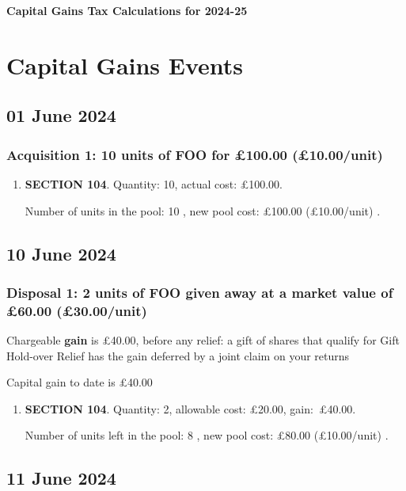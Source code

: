 \documentclass{article}
\begin{document}
\centerline{\Large\bfseries Capital Gains Tax Calculations for 2024-25}

\section*{Capital Gains Events}


\subsection*{01 June 2024}
\subsubsection*{
    Acquisition 1: 10 units of FOO for £100.00
    (£10.00/unit)%
}

\begin{enumerate}
\item \textbf{SECTION 104}. Quantity: 10,
    actual cost: £100.00.

    Number of units in the pool:
    10%
,
    new pool cost: £100.00
    (£10.00/unit)%
.

\end{enumerate}



\subsection*{10 June 2024}
\subsubsection*{
    Disposal 1: 2 units of FOO
given away at a market value of £60.00
    (£30.00/unit)%
}
Chargeable \textbf{gain} is £40.00, before any relief:
a gift of shares that qualify for Gift Hold-over Relief has the gain deferred by a joint claim on your returns

Capital gain to date is £40.00

\begin{enumerate}
\item \textbf{SECTION 104}. Quantity: 2,
    allowable
    cost:
    £20.00,
    \mbox{gain: £40.00.}

    Number of units left in the pool:
    8%
,
    new pool cost: £80.00
    (£10.00/unit)%
.

\end{enumerate}



\subsection*{11 June 2024}
\end{document}
